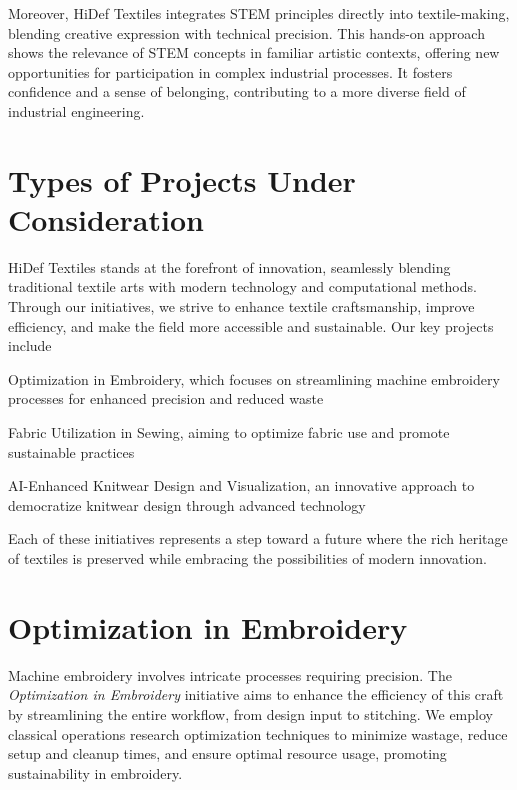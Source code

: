 \documentclass{article}
\begin{document}
    Moreover, HiDef Textiles integrates STEM principles directly into textile-making, blending creative expression
    with technical precision. This hands-on approach shows the relevance of STEM concepts in familiar artistic
    contexts, offering new opportunities for participation in complex industrial processes. It fosters confidence and
    a sense of belonging, contributing to a more diverse field of industrial engineering.


    \section{Types of Projects Under Consideration}

    HiDef Textiles stands at the forefront of innovation, seamlessly blending traditional textile arts with modern
    technology and computational methods. Through our initiatives, we strive to enhance textile craftsmanship, improve
    efficiency, and make the field more accessible and sustainable. Our key projects include
    \begin{enumerate*}
        \item Optimization in Embroidery, which focuses on streamlining machine embroidery processes for enhanced precision
        and reduced waste
        \item Fabric Utilization in Sewing, aiming to optimize fabric use and promote sustainable practices
        \item AI-Enhanced Knitwear Design and Visualization, an innovative approach to democratize knitwear design
        through advanced technology
    \end{enumerate*}
    Each of these initiatives represents a step toward a future where the rich heritage of textiles is preserved
    while embracing the possibilities of modern innovation.


    \section{Optimization in Embroidery}

    Machine embroidery involves intricate processes requiring precision. The \emph{Optimization in Embroidery}
    initiative aims to enhance the efficiency of this craft by streamlining the entire workflow, from design input
    to stitching.
    We employ classical operations research optimization techniques to minimize wastage, reduce setup and cleanup times,
    and ensure optimal resource usage, promoting sustainability in embroidery.
\end{document}
